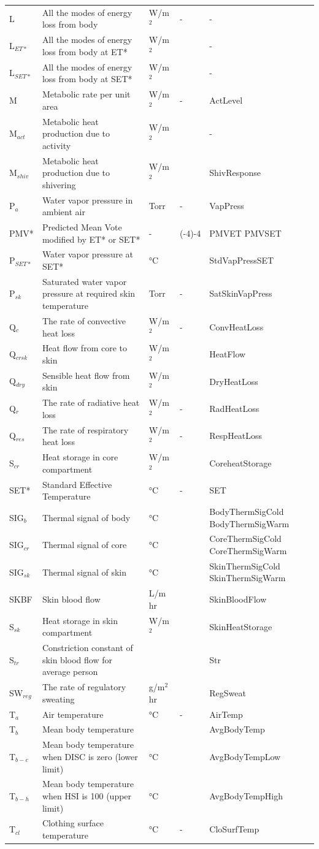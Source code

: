 \begin{longtable}[c]{p{1.2in}p{2.0in}p{0.8in}p{0.8in}p{1.2in}}
L & All the modes of energy loss from body & W/m\(^{2}\) & - & - \tabularnewline
L\(_{ET*}\) & All the modes of energy loss from body at ET* & W/m\(^{2}\) & ~ & - \tabularnewline
L\(_{SET*}\) & All the modes of energy loss from body at SET* & W/m\(^{2}\) & ~ & - \tabularnewline
M & Metabolic rate per unit area & W/m\(^{2}\) & - & ActLevel \tabularnewline
M\(_{act}\) & Metabolic heat production due to activity & W/m\(^{2}\) & ~ & - \tabularnewline
M\(_{shiv}\) & Metabolic heat production due to shivering & W/m\(^{2}\) & ~ & ShivResponse \tabularnewline
P\(_{a}\) & Water vapor pressure in ambient air & Torr & - & VapPress \tabularnewline
PMV* & Predicted Mean Vote modified by ET* or SET* & - & (-4)-4 & PMVET PMVSET \tabularnewline
P\(_{SET*}\) & Water vapor pressure at SET* & °C & ~ & StdVapPressSET \tabularnewline
P\(_{sk}\) & Saturated water vapor pressure at required skin temperature & Torr & - & SatSkinVapPress \tabularnewline
Q\(_{c}\) & The rate of convective heat loss & W/m\(^{2}\) & - & ConvHeatLoss \tabularnewline
Q\(_{crsk}\) & Heat flow from core to skin & W/m\(^{2}\) & ~ & HeatFlow \tabularnewline
Q\(_{dry}\) & Sensible heat flow from skin & W/m\(^{2}\) & ~ & DryHeatLoss \tabularnewline
Q\(_{r}\) & The rate of radiative heat loss & W/m\(^{2}\) & - & RadHeatLoss \tabularnewline
Q\(_{res}\) & The rate of respiratory heat loss & W/m\(^{2}\) & - & RespHeatLoss \tabularnewline
S\(_{cr}\) & Heat storage in core compartment & W/m\(^{2}\) & ~ & CoreheatStorage \tabularnewline
SET* & Standard Effective Temperature & °C & - & SET \tabularnewline
SIG\(_{b}\) & Thermal signal of body & °C & ~ & BodyThermSigCold BodyThermSigWarm \tabularnewline
SIG\(_{cr}\) & Thermal signal of core & °C & ~ & CoreThermSigCold CoreThermSigWarm \tabularnewline
SIG\(_{sk}\) & Thermal signal of skin & °C & ~ & SkinThermSigCold SkinThermSigWarm \tabularnewline
SKBF & Skin blood flow & L/m  hr & ~ & SkinBloodFlow \tabularnewline
S\(_{sk}\) & Heat storage in skin compartment & W/m\(^{2}\) & ~ & SkinHeatStorage \tabularnewline
S\(_{tr}\) & Constriction constant of skin blood flow for average person & ~ & ~ & Str \tabularnewline
SW\(_{reg}\) & The rate of regulatory sweating & g/m\(^{2}\)hr & ~ & RegSweat \tabularnewline
T\(_{a}\) & Air temperature & °C & - & AirTemp \tabularnewline
T\(_{b}\) & Mean body temperature & ~ & ~ & AvgBodyTemp \tabularnewline
T\(_{b-c}\) & Mean body temperature when DISC is zero (lower limit) & °C & ~ & AvgBodyTempLow \tabularnewline
T\(_{b-h}\) & Mean body temperature when HSI is 100 (upper limit) & °C & ~ & AvgBodyTempHigh \tabularnewline
T\(_{cl}\) & Clothing surface temperature & °C & - & CloSurfTemp \tabularnewline

\end{longtable}
